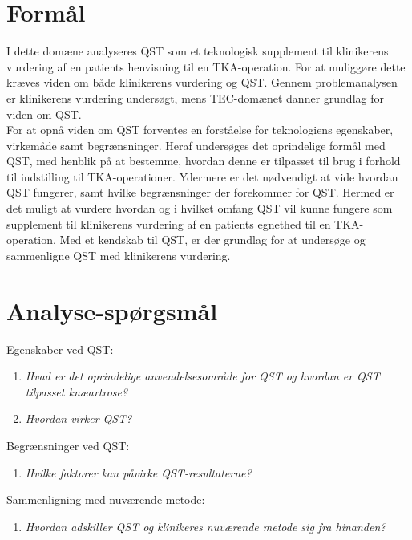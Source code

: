 \section{Formål} 
I dette domæne analyseres QST som et teknologisk supplement til klinikerens vurdering af en patients henvisning til en TKA-operation. For at muliggøre dette kræves viden om både klinikerens vurdering og QST. Gennem problemanalysen er klinikerens vurdering undersøgt, mens TEC-domænet danner grundlag for viden om QST.\\
For at opnå viden om QST forventes en forståelse for teknologiens egenskaber, virkemåde samt begrænsninger. Heraf undersøges det oprindelige formål med QST, med henblik på at bestemme, hvordan denne er tilpasset til brug i forhold til indstilling til TKA-operationer. Ydermere er det nødvendigt at vide hvordan QST fungerer, samt hvilke begrænsninger der forekommer for QST. Hermed er det muligt at vurdere hvordan og i hvilket omfang QST vil kunne fungere som supplement til klinikerens vurdering af en patients egnethed til en TKA-operation. Med et kendskab til QST, er der grundlag for at undersøge og sammenligne QST med klinikerens vurdering. 

\section{Analyse-spørgsmål}
Egenskaber ved QST:
\begin{enumerate}
	\item \textit{Hvad er det oprindelige anvendelsesområde for QST og hvordan er QST tilpasset knæartrose?} %
	\item \textit{Hvordan virker QST?}  %
\end{enumerate}
Begrænsninger ved QST:
\begin{enumerate}[resume]
	\item \textit{Hvilke faktorer kan påvirke QST-resultaterne?}
\end{enumerate}
Sammenligning med nuværende metode:
\begin{enumerate}[resume]
	\item \textit{Hvordan adskiller QST og klinikeres nuværende metode sig fra hinanden?} %
\end{enumerate}


